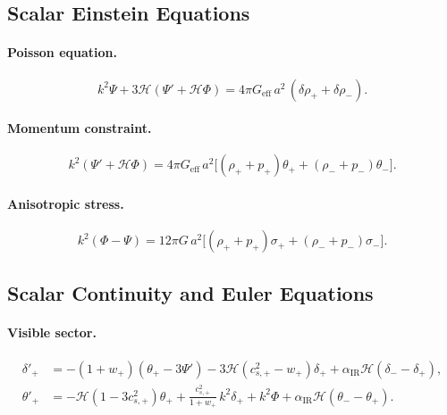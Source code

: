 \documentclass[11pt,a4paper]{article}
\begin{document}
\subsection{Scalar Einstein Equations}

\paragraph{Poisson equation.}
\begin{equation}
    k^{2}\Psi + 3\mathcal{H}(\Psi' + \mathcal{H}\Phi)
    = 4\pi G_{\mathrm{eff}}\,a^{2}\,(\delta\rho_{+} + \delta\rho_{-}).
\end{equation}

\paragraph{Momentum constraint.}
\begin{equation}
    k^{2}(\Psi' + \mathcal{H}\Phi)
    = 4\pi G_{\mathrm{eff}}\,a^{2}\bigl[(\rho_{+}+p_{+})\theta_{+}
    + (\rho_{-}+p_{-})\theta_{-}\bigr].
\end{equation}

\paragraph{Anisotropic stress.}
\begin{equation}
    k^{2}(\Phi - \Psi)
    = 12\pi G\,a^{2}\bigl[(\rho_{+}+p_{+})\sigma_{+}
    + (\rho_{-}+p_{-})\sigma_{-}\bigr].
\end{equation}

\subsection{Scalar Continuity and Euler Equations}

\paragraph{Visible sector.}
\begin{align}
    \delta'_{+}
    &= - (1+w_{+})(\theta_{+} - 3\Psi')
       - 3\mathcal{H}(c_{s,+}^{2} - w_{+})\delta_{+}
       + \alpha_{\mathrm{IR}}\mathcal{H}(\delta_{-} - \delta_{+}), \\
    \theta'_{+}
    &= - \mathcal{H}(1 - 3c_{s,+}^{2})\theta_{+}
       + \frac{c_{s,+}^{2}}{1+w_{+}}\,k^{2}\delta_{+}
       + k^{2}\Phi
       + \alpha_{\mathrm{IR}}\mathcal{H}(\theta_{-} - \theta_{+}).
\end{align}
\end{document}
